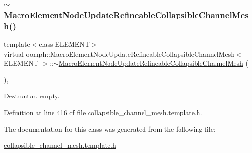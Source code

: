 \subsubsection{\texorpdfstring{$\sim$\+Macro\+Element\+Node\+Update\+Refineable\+Collapsible\+Channel\+Mesh()}{~MacroElementNodeUpdateRefineableCollapsibleChannelMesh()}}
{\footnotesize\ttfamily template$<$class E\+L\+E\+M\+E\+NT$>$ \\
virtual \hyperlink{classoomph_1_1MacroElementNodeUpdateRefineableCollapsibleChannelMesh}{oomph\+::\+Macro\+Element\+Node\+Update\+Refineable\+Collapsible\+Channel\+Mesh}$<$ E\+L\+E\+M\+E\+NT $>$\+::$\sim$\hyperlink{classoomph_1_1MacroElementNodeUpdateRefineableCollapsibleChannelMesh}{Macro\+Element\+Node\+Update\+Refineable\+Collapsible\+Channel\+Mesh} (\begin{DoxyParamCaption}{ }\end{DoxyParamCaption})\hspace{0.3cm}{\ttfamily [inline]}, {\ttfamily [virtual]}}



Destructor\+: empty. 



Definition at line 416 of file collapsible\+\_\+channel\+\_\+mesh.\+template.\+h.



The documentation for this class was generated from the following file\+:\begin{DoxyCompactItemize}
\item 
\hyperlink{collapsible__channel__mesh_8template_8h}{collapsible\+\_\+channel\+\_\+mesh.\+template.\+h}\end{DoxyCompactItemize}
